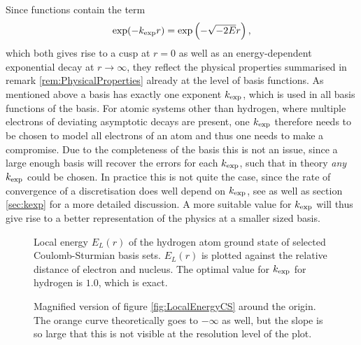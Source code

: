 \noindent
Since \CS functions contain the term
\[ \exp(-k_\text{exp} r) = \exp\left( - \sqrt{-2E}r \right), \]
which both gives rise to a cusp at $r=0$ as well as
an energy-dependent exponential decay at $r\to\infty$,
they reflect the physical properties summarised in remark \vref{rem:PhysicalProperties}
already at the level of basis functions.
As mentioned above a \CS basis has exactly one exponent $k_\text{exp}$,
which is used in all basis functions of the \CS basis.
For atomic systems other than hydrogen,
where multiple electrons of deviating asymptotic decays are present,
one $k_\text{exp}$ therefore needs to be chosen to model all electrons of an atom
and thus one needs to make a compromise.
Due to the completeness of the \CS basis
this is not an issue, since a large enough basis will recover the errors
for each $k_\text{exp}$, such that in theory \emph{any} $k_\text{exp}$ could be chosen.
In practice this is not quite the case,
since the rate of convergence of a \CS discretisation
does well depend on $k_\text{exp}$,
see \cite{Avery2017} as well as section \vref{sec:kexp} for a more detailed discussion.
A more suitable value for $k_\text{exp}$ will thus give rise
to a better representation of the physics at a smaller sized \CS basis.
%
\begin{figure}[p]
	\centering
	\caption[Local energy of the hydrogen ground state for {\CS} bases]{
		Local energy $E_L(r)$ of the hydrogen atom ground state
		of selected Coulomb-Sturmian basis sets.
		$E_L(r)$ is plotted against the relative distance
		of electron and nucleus.
		The optimal value for $k_\text{exp}$ for hydrogen is $1.0$,
		which is exact.
	}
	\label{fig:LocalEnergyCS}
\end{figure}
%
\begin{figure}[p]
	\centering
	\caption[Local energy of the hydrogen ground state for {\CS} bases (magnified)]{
		Magnified version of figure \vref{fig:LocalEnergyCS}
		around the origin.
		The orange curve theoretically goes to $-\infty$ as well,
		but the slope is so large that this is not visible
		at the resolution level of the plot.
	}
	\label{fig:LocalEnergyCSZoom}
\end{figure}

